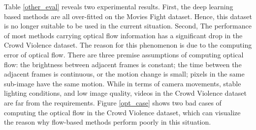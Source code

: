 \documentclass[a4paper,conference]{IEEEtran}
\begin{document}
Table \ref{other_eval} reveals two experimental results. First, the deep learning based methods are all over-fitted on the Movies Fight dataset. Hence, this dataset is no longer suitable to be used in the current situation. Second, The performance of most methods carrying optical flow information has a significant drop in the Crowd Violence dataset. The reason for this phenomenon is due to the computing error of optical flow. There are three premise assumptions \cite{opt_computation} of computing optical flow: the brightness between adjacent frames is constant; the time between the adjacent frames is continuous, or the motion change is small; pixels in the same sub-image have the same motion.  While in terms of camera movements, stable lighting conditions, and low image quality, videos in the Crowd Violence dataset are far from the requirements. Figure \ref{opt_case} shows two bad cases of computing the optical flow in the Crowd Violence dataset, which can visualize the reason why flow-based methods perform poorly in this situation.
\end{document}
